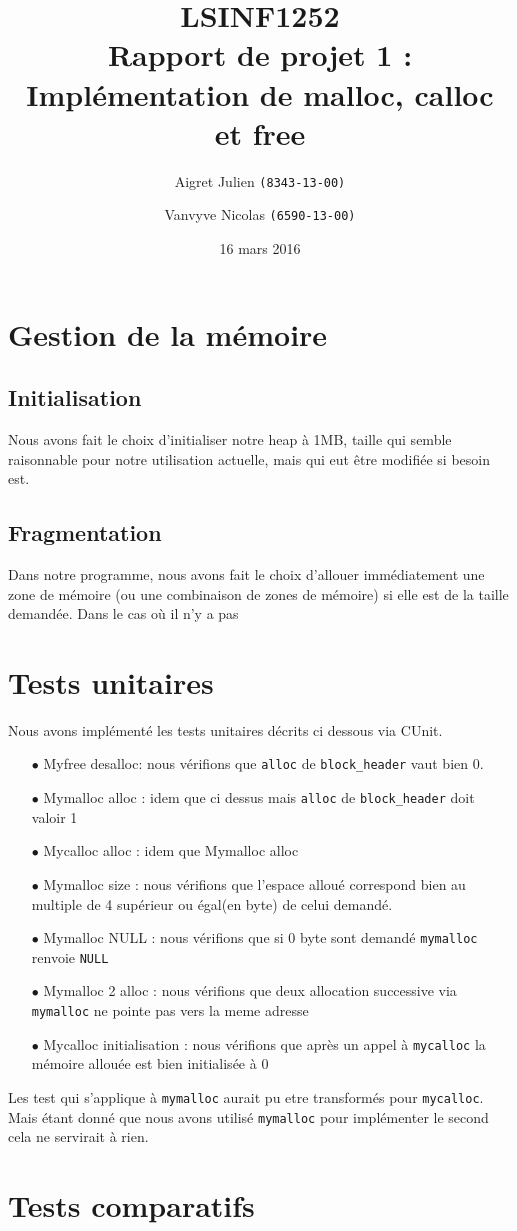 \documentclass[10pt,a4paper]{article}
\author{Aigret Julien \texttt{(8343-13-00)}\and Vanvyve Nicolas \texttt{(6590-13-00)}}
\date{16 mars 2016}
\title{LSINF1252\\Rapport de projet 1 :\\Implémentation de malloc, calloc et free}
\begin{document}
\maketitle

\section{Gestion de la mémoire}
\subsection{Initialisation}
Nous avons fait le choix d'initialiser notre heap à 1MB, taille qui semble raisonnable pour notre utilisation actuelle, mais qui eut être modifiée si besoin est.

\subsection{Fragmentation}
Dans notre programme, nous avons fait le choix d'allouer immédiatement une zone de mémoire (ou une combinaison de zones de mémoire) si elle est de la taille demandée. Dans le cas où il n'y a pas

\section{Tests unitaires}

Nous avons implémenté les tests unitaires décrits ci dessous via CUnit.
\begin{itemize}
	\item [$\bullet$] Myfree desalloc: nous vérifions que \texttt{alloc} de \texttt{block\_header} vaut bien 0.
	\item [$\bullet$] Mymalloc alloc : idem que ci dessus mais \texttt{alloc} de \texttt{block\_header} doit valoir 1
	\item [$\bullet$] Mycalloc alloc : idem que Mymalloc alloc
	\item [$\bullet$] Mymalloc size : nous vérifions que l'espace alloué correspond bien au multiple de 4 supérieur ou égal(en byte) de celui demandé.
	\item [$\bullet$] Mymalloc NULL : nous vérifions que si 0 byte sont demandé \texttt{mymalloc} renvoie \texttt{NULL}
	\item [$\bullet$] Mymalloc 2 alloc : nous vérifions que deux allocation successive via \texttt{mymalloc} ne pointe pas vers la meme adresse
	\item [$\bullet$] Mycalloc initialisation : nous vérifions que après un appel à \texttt{mycalloc} la mémoire allouée est bien initialisée à 0
\end{itemize}
Les test qui s'applique à \texttt{mymalloc} aurait pu etre transformés pour \texttt{mycalloc}. Mais étant donné que nous avons utilisé \texttt{mymalloc} pour implémenter le second cela ne servirait à rien.

\section{Tests comparatifs}
\end{document}

